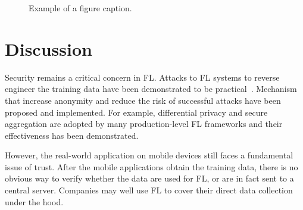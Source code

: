 \documentclass[conference]{IEEEtran}
\begin{document}
\begin{figure}[htbp]
\centerline{
}
\caption{Example of a figure caption.}
\label{fig}
\end{figure}

\section{Discussion}


Security remains a critical concern in FL.
Attacks to FL systems to reverse engineer the training data have been
demonstrated to be practical~\cite{sun2019really}.
Mechanism that increase anonymity and
reduce the risk of successful attacks have been proposed and implemented.
For example, differential privacy and secure aggregation are
adopted by many production-level FL frameworks and
their effectiveness has been demonstrated.

However, the real-world application on mobile devices still faces a fundamental
issue of trust.
After the mobile applications obtain the training data,
there is no obvious way to verify whether the data are used for FL,
or are in fact sent to a central server.
Companies may well use FL to cover their direct data collection under the hood.

\printbibliography

\end{document}
